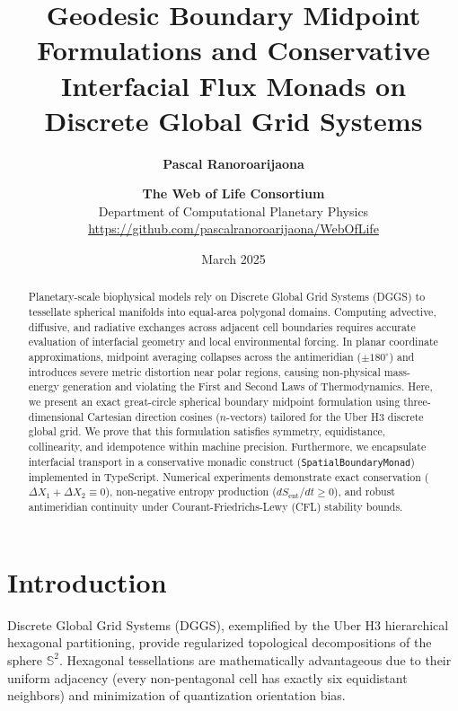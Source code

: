 \documentclass[11pt,a4paper]{article}
\title{\textbf{Geodesic Boundary Midpoint Formulations and Conservative Interfacial Flux Monads on Discrete Global Grid Systems}}
\author{
  \textbf{Pascal Ranoroarijaona} \and \textbf{The Web of Life Consortium} \\
  \small Department of Computational Planetary Physics \\
  \small \url{https://github.com/pascalranoroarijaona/WebOfLife}
}
\date{March 2025}
\theoremstyle{definition}
\begin{document}
\maketitle

\begin{abstract}
Planetary-scale biophysical models rely on Discrete Global Grid Systems (DGGS) to tessellate spherical manifolds into equal-area polygonal domains. Computing advective, diffusive, and radiative exchanges across adjacent cell boundaries requires accurate evaluation of interfacial geometry and local environmental forcing. In planar coordinate approximations, midpoint averaging collapses across the antimeridian ($\pm 180^\circ$) and introduces severe metric distortion near polar regions, causing non-physical mass-energy generation and violating the First and Second Laws of Thermodynamics. Here, we present an exact great-circle spherical boundary midpoint formulation using three-dimensional Cartesian direction cosines ($n$-vectors) tailored for the Uber H3 discrete global grid. We prove that this formulation satisfies symmetry, equidistance, collinearity, and idempotence within machine precision. Furthermore, we encapsulate interfacial transport in a conservative monadic construct (\texttt{SpatialBoundaryMonad}) implemented in TypeScript. Numerical experiments demonstrate exact conservation ($\Delta X_1 + \Delta X_2 \equiv 0$), non-negative entropy production ($d S_{\text{ent}}/dt \ge 0$), and robust antimeridian continuity under Courant-Friedrichs-Lewy (CFL) stability bounds.
\end{abstract}

\section{Introduction}
Discrete Global Grid Systems (DGGS), exemplified by the Uber H3 hierarchical hexagonal partitioning, provide regularized topological decompositions of the sphere $\mathbb{S}^2$. Hexagonal tessellations are mathematically advantageous due to their uniform adjacency (every non-pentagonal cell has exactly six equidistant neighbors) and minimization of quantization orientation bias.
\end{document}
